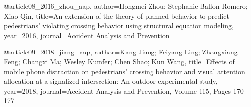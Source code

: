 @article{08_2016_zhou_aap,
  author={Hongmei Zhou; Stephanie Ballon Romero; Xiao Qin},
  title={An extension of the theory of planned behavior to predict pedestrians' violating crossing behavior using structural equation modeling},
  year={2016},
  journal={Accident Analysis and Prevention}
}

@article{09_2018_jiang_aap,
  author={Kang Jiang; Feiyang Ling; Zhongxiang Feng; Changxi Ma; Wesley Kumfer; Chen Shao; Kun Wang},
  title={Effects of mobile phone distraction on pedestrians' crossing behavior and visual attention allocation at a signalized intersection: An outdoor experimental study},
  year={2018},
  journal={Accident Analysis and Prevention, Volume 115, Pages 170-177}
}